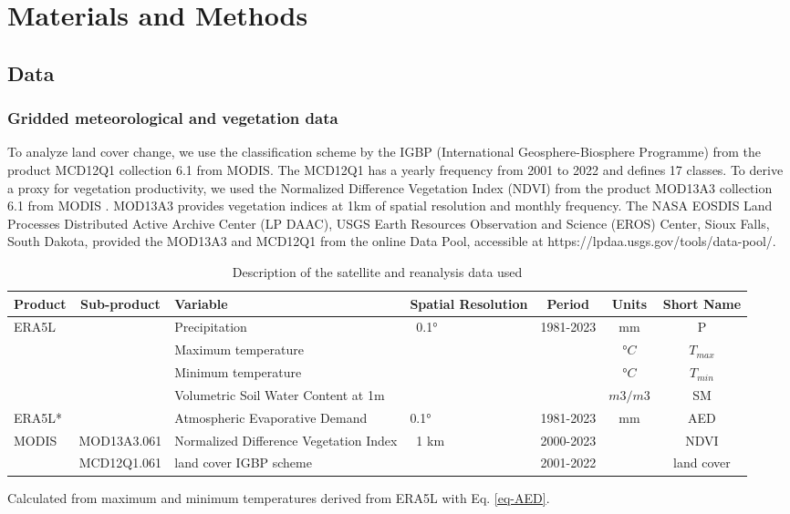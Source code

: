 \documentclass[
  authoryear,
  preprint,
  3p,
  onecolumn]{elsarticle}
\begin{document}
\hypertarget{materials-and-methods}{%
\section{Materials and Methods}\label{materials-and-methods}}

\hypertarget{data}{%
\subsection{Data}\label{data}}

\hypertarget{gridded-meteorological-and-vegetation-data}{%
\subsubsection{Gridded meteorological and vegetation
data}\label{gridded-meteorological-and-vegetation-data}}

To analyze land cover change, we use the classification scheme by the
IGBP (International Geosphere-Biosphere Programme) from the product
MCD12Q1 collection 6.1 from MODIS. The MCD12Q1 has a yearly frequency
from 2001 to 2022 and defines 17 classes. To derive a proxy for
vegetation productivity, we used the Normalized Difference Vegetation
Index (NDVI) from the product MOD13A3 collection 6.1 from MODIS
\citep{Didan2015}. MOD13A3 provides vegetation indices at 1km of spatial
resolution and monthly frequency. The NASA EOSDIS Land Processes
Distributed Active Archive Center (LP DAAC), USGS Earth Resources
Observation and Science (EROS) Center, Sioux Falls, South Dakota,
provided the MOD13A3 and MCD12Q1 from the online Data Pool, accessible
at https://lpdaa.usgs.gov/tools/data-pool/.

\begin{table}[!ht]
\caption{Description of the satellite and reanalysis data used}
\label{tab-desEOD}
\small
\centering
\begin{tabular}{p{}cp{}p{}ccc}
\hline
\multirow{1}{*}{\centering Product} & Sub-product & Variable & Spatial Resolution  & Period & Units & Short Name \\ 
\hline
\multirow{4}{*}{ERA5L} & ~ & Precipitation & \multirow{4}{*}{~0.1°} & \multirow{4}{*}{1981-2023} & mm & P \\ 
         &  & Maximum temperature & ~ & & $°C$ & $T_{max}$ \\ 
         &  & Minimum temperature & ~ & & $°C$ & $T_{min}$ \\ 
         &  & Volumetric Soil Water Content at 1m & ~ & & $m3/m3$ & SM \\ 
ERA5L* & & Atmospheric Evaporative Demand & 0.1° & 1981-2023 & mm & AED \\
        \multirow{2}{*}{MODIS} & MOD13A3.061 & Normalized Difference Vegetation Index & \multirow{2}{*}{~1 km} & 2000-2023 & ~ & NDVI \\ 
         & MCD12Q1.061 & land cover IGBP scheme & & 2001-2022 & ~ & land cover \\ 
\hline
\end{tabular}
{\raggedright *Calculated from maximum and minimum temperatures derived from ERA5L with Eq. \ref{eq-AED}. \par}
\end{table}
\end{document}
